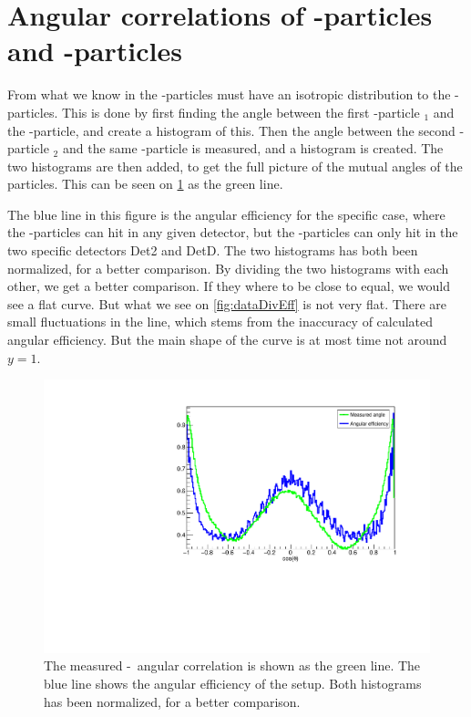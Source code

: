\section{Angular correlations of \al-particles and \be-particles}
\label{sec:betaAngle}
From what we know in \cite{isotrop} the \be-particles must have an isotropic distribution to the \al-particles. 
This is done by first finding the angle between the first \al-particle \al$_1$ and the \be-particle, and create a histogram of this. Then the angle between the second \al-particle \al$_2$ and the same \be-particle is measured, and a histogram is created. The two histograms are then added, to get the full picture of the mutual angles of the particles. 
This can be seen on \cref{fig:effwithweight} as the green line.  

The blue line in this figure is the angular efficiency for the specific case, where the \al-particles can hit in any given detector, but the \be-particles can only hit in the two specific detectors Det2 and DetD. The two histograms has both been normalized, for a better comparison. By dividing the two histograms with each other, we get a better comparison. If they where to be close to equal, we would see a flat curve. But what we see on \cref{fig:dataDivEff} is not very flat. 
There are small fluctuations in the line, which stems from the inaccuracy of calculated angular efficiency. But the main shape of the curve is at most time not around $y=1$.

\begin{figure}[h]
	\centering
	\includegraphics[width=\linewidth]{../figures/betaAngles/betaAngle.pdf}
	\caption{The measured \be-\al\ angular correlation is shown as the green line. The blue line shows the angular efficiency of the setup. Both histograms has been normalized, for a better comparison.}
	\label{fig:effwithweight}
\end{figure}

